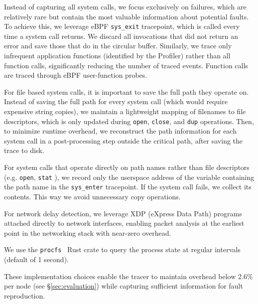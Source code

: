 Instead of capturing all system calls, we focus exclusively on failures, which are relatively rare but contain the most valuable information about potential faults.
To achieve this, we leverage eBPF \texttt{sys\_exit} tracepoint, which is called every time a system call returns.
We discard all invocations that did not return an error and save those that do in the circular buffer.
Similarly, we trace only infrequent application functions (identified by the Profiler) rather than all function calls, significantly reducing the number of traced events.
Function calls are traced through eBPF user-function probes.


For file based system calls, it is important to save the full path they operate on.
Instead of saving the full path for every system call (which would require expensive string copies), we maintain a lightweight mapping of filenames to file descriptors, which is only updated during \texttt{open}, \texttt{close}, and \texttt{dup} operations.
Then, to minimize runtime overhead, we reconstruct the path information for each system call in a post-processing step outside the critical path, after saving the trace to disk.

For system calls that operate directly on path names rather than file descriptors (e.g. \texttt{open}, \texttt{stat} ), we record only the userspace address of the variable containing the path name  in the \texttt{sys\_enter}  tracepoint.
If the system call fails, we collect its contents. This way we avoid unnecessary copy operations.


For network delay detection, we leverage XDP (eXpress Data Path) programs attached directly to network interfaces, enabling packet analysis at the earliest point in the networking stack with near-zero overhead.

We use the \texttt{procfs}~\cite{procfs} Rust crate to query the process state at regular intervals (default of 1 second).

These implementation choices enable the tracer to maintain overhead below 2.6\% per node (see \S\ref{sec:evaluation}) while capturing sufficient information for fault reproduction.


